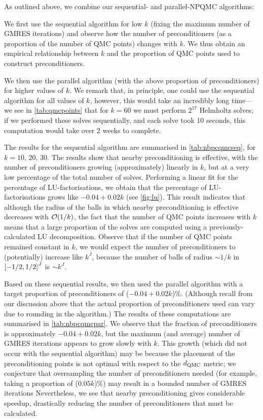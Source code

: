 As outlined above, we combine our sequential- and parallel-NPQMC algorithms:\label{page:seqandpar}
\bit
\item We first use the sequential algorithm for low $k$ (fixing the maximum number of GMRES iterations) and observe how the number of preconditioners (as a proportion of the number of QMC points) changes with $k$. We thus obtain an empirical relationship between $k$ and the proportion of QMC points used to construct preconditioners.
  \item We then use the parallel algorithm (with the above proportion of preconditioners) for higher values of $k.$
    \eit
    We remark that, in principle, one could use the sequential algorithm for all values of $k$, however, this would take an incredibly long time--- we see in \cref{tab:qmcpoints} that for $k=60$ we must perform $2^{17}$ Helmholtz solves; if we performed these solves sequentially, and each solve took 10 seconds, this computation would take over 2 weeks to complete.

    The results for the sequential algorithm are summarised in \cref{tab:nbpcqmcseq}, for $k = 10,\,20,\,30$. The results show that nearby preconditioning is effective, with the number of preconditioners growing (approximately) linearly in $k$, but at a very low percentage of the total number of solves. Performing a linear fit for the percentage of LU-factorisations, we obtain that the percentage of LU-factorisations grows like $-0.04 + 0.02k$ (see \cref{fig:lu}). This result indicates that although the radius of the balls in which nearby preconditioning is effective decreases with $\cO\mleft(1/k\mright)$, the fact that the number of QMC points increases with $k$ means that a large proportion of the solves are computed using a previously-calculated LU decomposition. Observe that if the number of QMC points remained constant in $k$, we would expect the number of preconditioners to (potentially) increase like $k^J$, because the number of balls of radius $\sim 1/k$ in $\cube{J}$ is $\sim k^J.$

    Based on these sequential results, we then used the parallel algorithm with a target proportion of preconditioners of ($-0.04 + 0.02k$)\%. (Although recall from our discussion above that the actual proportion of preconditioners used can vary due to rounding in the algorithm.) The results of these computations are summarised in \cref{tab:nbpcqmcpar}. We observe that the fraction of preconditioners is approximately $-0.04 + 0.02k$, but the maximum (and average) number of GMRES iterations appears to grow slowly with $k.$ This growth (which did not occur with the sequential algorithm) may be because the placement of the preconditioning points is not optimal with respect to the $d_{\mathrm{QMC}}$ metric; we conjecture that oversampling the number of preconditioners needed (for example, taking a proportion of ($0.05k$)\%) may result in a bounded number of GMRES iterations Nevertheless, we see that nearby preconditioning gives considerable speedup, drastically reducing the number of preconditioners that must be calculated.

